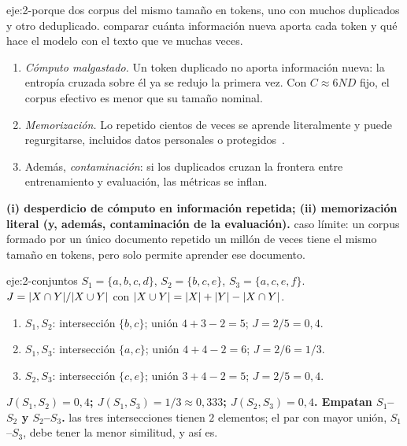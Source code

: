 \begin{solucion}{eje:2-porque}
\datos dos corpus del mismo tamaño en tokens, uno con muchos duplicados y otro deduplicado.
\planteamiento comparar cuánta información nueva aporta cada token y qué hace el modelo con el texto que ve muchas veces.
\pasos
\begin{enumerate}[label=\arabic*.]
  \item \emph{Cómputo malgastado.} Un token duplicado no aporta información nueva: la entropía cruzada sobre él ya se redujo la primera vez. Con $C\approx 6ND$ fijo, el corpus efectivo es menor que su tamaño nominal.
  \item \emph{Memorización.} Lo repetido cientos de veces se aprende literalmente y puede regurgitarse, incluidos datos personales o protegidos~\cite{lee}.
  \item Además, \emph{contaminación}: si los duplicados cruzan la frontera entre entrenamiento y evaluación, las métricas se inflan.
\end{enumerate}
\resultado \textbf{(i) desperdicio de cómputo en información repetida; (ii) memorización literal (y, además, contaminación de la evaluación).}
\comprobacion caso límite: un corpus formado por un único documento repetido un millón de veces tiene el mismo tamaño en tokens, pero solo permite aprender ese documento.
\end{solucion}

\begin{solucion}{eje:2-conjuntos}
\datos $S_1=\{a,b,c,d\}$, $S_2=\{b,c,e\}$, $S_3=\{a,c,e,f\}$.
\planteamiento $J=\lvert X\cap Y\rvert/\lvert X\cup Y\rvert$ con $\lvert X\cup Y\rvert=\lvert X\rvert+\lvert Y\rvert-\lvert X\cap Y\rvert$.
\pasos
\begin{enumerate}[label=\arabic*.]
  \item $S_1,S_2$: intersección $\{b,c\}$; unión $4+3-2=5$; $J=2/5=0{,}4$.
  \item $S_1,S_3$: intersección $\{a,c\}$; unión $4+4-2=6$; $J=2/6=1/3$.
  \item $S_2,S_3$: intersección $\{c,e\}$; unión $3+4-2=5$; $J=2/5=0{,}4$.
\end{enumerate}
\resultado \textbf{$J(S_1,S_2)=0{,}4$; $J(S_1,S_3)=1/3\approx 0{,}333$; $J(S_2,S_3)=0{,}4$. Empatan $S_1$--$S_2$ y $S_2$--$S_3$.}
\comprobacion las tres intersecciones tienen $2$ elementos; el par con mayor unión, $S_1$--$S_3$, debe tener la menor similitud, y así es.
\end{solucion}


